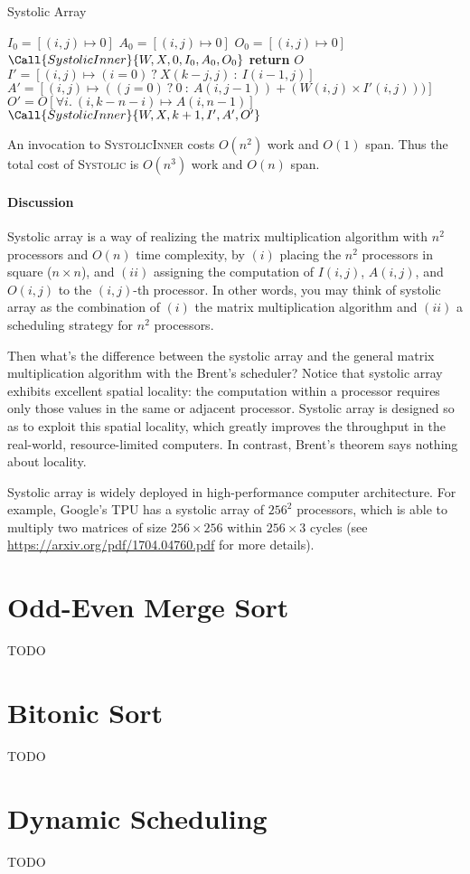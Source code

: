 \documentclass[11pt,a4paper,oneside,microtype,chapter,nokorean]{oblivoir}
\begin{document}
\begin{algorithm}
  \caption{Systolic Array}\label{systolic}
  \begin{algorithmic}[1]
     
    \State $I_0 = [(i,j) \mapsto 0]$ 
    \State $A_0 = [(i,j) \mapsto 0]$ 
    \State $O_0 = [(i,j) \mapsto 0]$ 
    \State $\Call{SystolicInner}{W,X,0,I_0,A_0,O_0}$
    \EndProcedure
    \Statex
     
    \State \textbf{return} $O$
    \EndIf
    \State $I' = [(i,j) \mapsto (i=0)~?~X(k-j,j)~:~I(i-1,j)]$
    \State $A' = [(i,j) \mapsto ((j=0)~?~0~:~A(i,j-1)) + (W(i,j) \times I'(i,j)))]$
    \State $O' = O[\forall i.~(i,k-n-i) \mapsto A(i,n-1)]$
    \State $\Call{SystolicInner}{W,X,k+1,I',A',O'}$
    \EndProcedure
  \end{algorithmic}
\end{algorithm}

An invocation to \textsc{SystolicInner} costs $O(n^2)$ work and $O(1)$ span.  Thus the total cost of
\textsc{Systolic} is $O(n^3)$ work and $O(n)$ span.


\paragraph{Discussion}

Systolic array is a way of realizing the matrix multiplication algorithm with $n^2$ processors and
$O(n)$ time complexity, by $(i)$ placing the $n^2$ processors in square ($n \times n$), and $(ii)$
assigning the computation of $I(i,j)$, $A(i,j)$, and $O(i,j)$ to the $(i,j)$-th processor.  In other
words, you may think of systolic array as the combination of $(i)$ the matrix multiplication
algorithm and $(ii)$ a scheduling strategy for $n^2$ processors.

Then what's the difference between the systolic array and the general matrix multiplication
algorithm with the Brent's scheduler?  Notice that systolic array exhibits excellent spatial
locality: the computation within a processor requires only those values in the same or adjacent
processor.  Systolic array is designed so as to exploit this spatial locality, which greatly
improves the throughput in the real-world, resource-limited computers.  In contrast, Brent's theorem
says nothing about locality.

Systolic array is widely deployed in high-performance computer architecture.  For example, Google's
TPU has a systolic array of ${256}^2$ processors, which is able to multiply two matrices of size
$256 \times 256$ within $256 \times 3$ cycles (see \url{https://arxiv.org/pdf/1704.04760.pdf} for
more details).


\section{Odd-Even Merge Sort}

TODO


\section{Bitonic Sort}

TODO


\section{Dynamic Scheduling}

TODO
\end{document}
